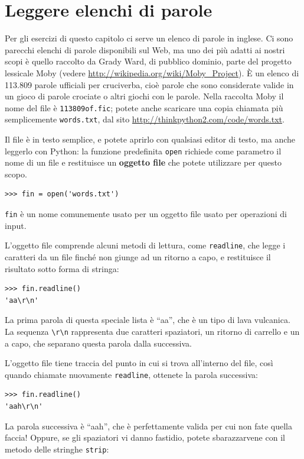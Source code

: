 \documentclass[10pt]{book}
\begin{document}
\section{Leggere elenchi di parole}
\label{wordlist}

Per gli esercizi di questo capitolo ci serve un elenco di parole in inglese. Ci sono parecchi elenchi di parole disponibili sul Web, ma uno dei più adatti ai nostri scopi è quello raccolto da Grady Ward, di pubblico dominio, parte del progetto lessicale Moby (vedere \url{http://wikipedia.org/wiki/Moby_Project}). È un elenco di 113.809 parole ufficiali per cruciverba, cioè parole che sono considerate valide in un gioco di parole crociate o altri giochi con le parole. Nella raccolta Moby il nome del file è {\tt 113809of.fic}; potete anche scaricare una copia chiamata più semplicemente {\tt words.txt}, dal sito
\url{http://thinkpython2.com/code/words.txt}.

Il file è in testo semplice, e potete aprirlo con qualsiasi editor di testo, ma anche leggerlo con Python: la funzione predefinita {\tt open} richiede come parametro il nome di un file e restituisce un {\bf oggetto file} che potete utilizzare per questo scopo.

\begin{verbatim}
>>> fin = open('words.txt')
\end{verbatim}
%
{\tt fin} è un nome comunemente usato per un oggetto file usato per operazioni di input.

L'oggetto file comprende alcuni metodi di lettura, come {\tt readline}, che legge i caratteri da un file finché non giunge ad un ritorno a capo, e restituisce il risultato sotto forma di stringa:

\begin{verbatim}
>>> fin.readline()
'aa\r\n'
\end{verbatim}
%
La prima parola di questa speciale lista è ``aa'', che è un tipo di lava vulcanica. La sequenza \verb"\r\n" rappresenta due caratteri spaziatori, un ritorno di carrello e un a capo, che separano questa parola dalla successiva.

L'oggetto file tiene traccia del punto in cui si trova all'interno del file, così quando chiamate nuovamente {\tt readline}, ottenete la parola successiva:

\begin{verbatim}
>>> fin.readline()
'aah\r\n'
\end{verbatim}
%
La parola successiva è ``aah'', che è perfettamente valida per cui non fate quella faccia! Oppure, se gli spaziatori vi danno fastidio, potete sbarazzarvene con il metodo delle stringhe {\tt strip}:
\end{document}
